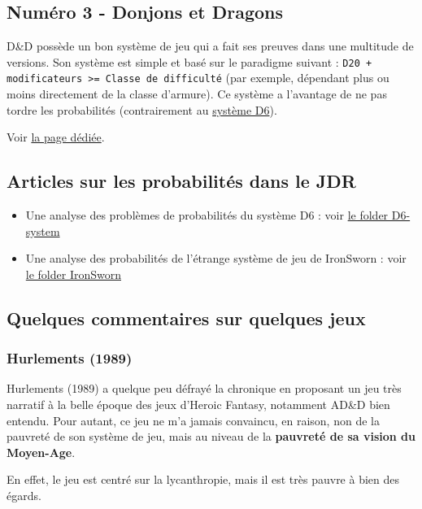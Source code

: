 \documentclass[a4paper, 11pt, twoside]{article}
\begin{document}
\subsection{Numéro 3 - Donjons et Dragons}
\label{sec:org75ee187}

D\&D possède un bon système de jeu qui a fait ses preuves dans une multitude de versions. Son système est simple et basé sur le paradigme suivant : \texttt{D20 + modificateurs >= Classe de difficulté} (par exemple, dépendant plus ou moins directement de la classe d'armure). Ce système a l'avantage de ne pas tordre les probabilités (contrairement au \href{https://github.com/orey/jdr/tree/master/D6-System}{système D6}).

Voir \href{https://github.com/orey/jdr/tree/master/DandD}{la page dédiée}.

\subsection{Articles sur les probabilités dans le JDR}
\label{sec:org3a75f49}

\begin{itemize}
\item Une analyse des problèmes de probabilités du système D6 : voir \href{https://github.com/orey/jdr/tree/master/D6-System}{le folder D6-system}
\item Une analyse des probabilités de l'étrange système de jeu de IronSworn : voir \href{https://github.com/orey/jdr/tree/master/IronSworn}{le folder IronSworn}
\end{itemize}

\subsection{Quelques commentaires sur quelques jeux}
\label{sec:org79fe3eb}
\subsubsection{Hurlements (1989)}
\label{sec:org1be17d1}

Hurlements (1989) a quelque peu défrayé la chronique en proposant un jeu très narratif à la belle époque des jeux d'Heroic Fantasy, notamment AD\&D bien entendu. Pour autant, ce jeu ne m'a jamais convaincu, en raison, non de la pauvreté de son système de jeu, mais au niveau de la \textbf{pauvreté de sa vision du Moyen-Age}.

En effet, le jeu est centré sur la lycanthropie, mais il est très pauvre à bien des égards.
\end{document}
